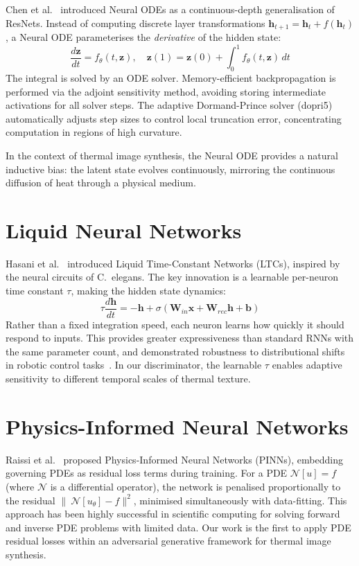 Chen et al.~\cite{b_neuralode} introduced Neural ODEs as a continuous-depth generalisation of ResNets. Instead of computing discrete layer transformations $\mathbf{h}_{t+1} = \mathbf{h}_t + f(\mathbf{h}_t)$, a Neural ODE parameterises the \emph{derivative} of the hidden state:
\begin{equation}
    \frac{d\mathbf{z}}{dt} = f_\theta(t, \mathbf{z}), \quad \mathbf{z}(1) = \mathbf{z}(0) + \int_0^1 f_\theta(t, \mathbf{z})\, dt
\end{equation}
The integral is solved by an ODE solver. Memory-efficient backpropagation is performed via the adjoint sensitivity method, avoiding storing intermediate activations for all solver steps. The adaptive Dormand-Prince solver (dopri5) automatically adjusts step sizes to control local truncation error, concentrating computation in regions of high curvature.

In the context of thermal image synthesis, the Neural ODE provides a natural inductive bias: the latent state evolves continuously, mirroring the continuous diffusion of heat through a physical medium.

\section{Liquid Neural Networks}

Hasani et al.~\cite{b_lnn} introduced Liquid Time-Constant Networks (LTCs), inspired by the neural circuits of C.\ elegans. The key innovation is a learnable per-neuron time constant $\tau$, making the hidden state dynamics:
\begin{equation}
    \tau \frac{d\mathbf{h}}{dt} = -\mathbf{h} + \sigma(\mathbf{W}_{in}\mathbf{x} + \mathbf{W}_{rec}\mathbf{h} + \mathbf{b})
\end{equation}
Rather than a fixed integration speed, each neuron learns how quickly it should respond to inputs. This provides greater expressiveness than standard RNNs with the same parameter count, and demonstrated robustness to distributional shifts in robotic control tasks~\cite{b_lnn2}. In our discriminator, the learnable $\tau$ enables adaptive sensitivity to different temporal scales of thermal texture.

\section{Physics-Informed Neural Networks}

Raissi et al.~\cite{b_pinn} proposed Physics-Informed Neural Networks (PINNs), embedding governing PDEs as residual loss terms during training. For a PDE $\mathcal{N}[u] = f$ (where $\mathcal{N}$ is a differential operator), the network is penalised proportionally to the residual $\|\ \mathcal{N}[u_\theta] - f\|^2$, minimised simultaneously with data-fitting. This approach has been highly successful in scientific computing for solving forward and inverse PDE problems with limited data. Our work is the first to apply PDE residual losses within an adversarial generative framework for thermal image synthesis.

